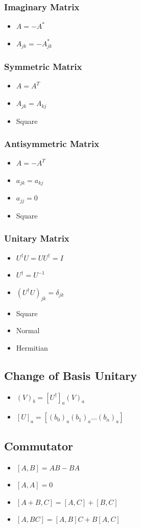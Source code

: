 \documentclass[]{report}
\newcommand \tab[1][1cm]{\hspace*{#1}}
\newcommand{\itemt}{\item \tab}
\begin{document}
\subsubsection{Imaginary Matrix}			
\begin{itemize}
\itemt \( A=-A^* \)
\itemt \( A_{jk}=-A^*_{jk} \)
\end{itemize}				

\subsubsection{Symmetric Matrix}			
\begin{itemize}
\itemt \( A=A^T \)
\itemt \( A_{jk} = A_{kj} \)
\itemt Square
\end{itemize}				

\subsubsection{Antisymmetric Matrix}			
\begin{itemize}
\itemt \( A=-A^T \)
\itemt \( a_{jk} = a_{kj} \)
\itemt \( a_{jj} = 0 \)
\itemt Square
\end{itemize}		

\subsubsection{Unitary Matrix}			
\begin{itemize}
\itemt \( {U}^\dagger {U} = {U}{U}^\dagger = I \)
\itemt \( {U}^\dagger = {U}^{-1} \)
\itemt \( ({U}^\dagger {U})_{jk} = \delta_{jk} \)
\itemt Square
\itemt Normal
\itemt Hermitian
\end{itemize}					


\subsection{Change of Basis Unitary}	
\begin{itemize}	
\itemt \( (V)_b = [U^\dagger]_a (V)_a \)				
\itemt \( [U]_a = [(b_0)_a(b_1)_a ... (b_n)_a] \)				
\end{itemize}				

\subsection{Commutator}		
\begin{itemize}
\itemt \( [A,B] = AB - BA \)
\itemt \( [A,A] = 0 \)
\itemt \( [A+B,C] = [A,C]+[B,C] \)
\itemt \( [A,BC] = [A,B]C+B[A,C] \)
\end{itemize}			
\end{document}
